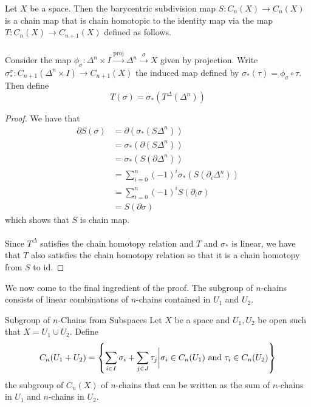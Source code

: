 \documentclass[a4paper]{article}
\begin{document}
\begin{prp}{}{} Let $X$ be a space. Then the barycentric subdivision map $S:C_n(X)\to C_n(X)$ is a chain map that is chain homotopic to the identity map via the map $T:C_n(X)\to C_{n+1}(X)$ defined as follows. \\~\\

Consider the map $\phi_\sigma:\Delta^n\times I\overset{\text{proj}}{\rightarrow}\Delta^n\overset{\sigma}{\rightarrow}X$ given by projection. Write $\sigma_\ast^\sigma:C_{n+1}(\Delta^n\times I)\to C_{n+1}(X)$ the induced map defined by $\sigma_\ast(\tau)=\phi_\sigma\circ\tau$. Then define $$T(\sigma)=\sigma_\ast(T^\Delta(\Delta^n))$$  \tcbline
\begin{proof}
We have that 
\begin{align*}
\partial S(\sigma)&=\partial(\sigma_\ast(S\Delta^n))\\
&=\sigma_\ast(\partial(S\Delta^n))\tag{$\sigma_\ast$ is a chain map}\\
&=\sigma_\ast(S(\partial\Delta^n))\tag{Lemma 4.2.4}\\
&=\sum_{i=0}^n(-1)^i\sigma_\ast(S(\partial_i\Delta^n))\\
&=\sum_{i=0}^n(-1)^iS(\partial_i\sigma)\tag{Definition of $S$}\\
&=S(\partial\sigma)
\end{align*}
which shows that $S$ is chain map. \\~\\

Since $T^\Delta$ satisfies the chain homotopy relation and $T$ and $\sigma_\ast$ is linear, we have that $T$ also satisfies the chain homotopy relation so that it is a chain homotopy from $S$ to $\text{id}$. 
\end{proof}
\end{prp}

We now come to the final ingredient of the proof. The subgroup of $n$-chains consists of linear combinations of $n$-chains contained in $U_1$ and $U_2$. 

\begin{defn}{Subgroup of $n$-Chains from Subspaces}{} Let $X$ be a space and $U_1,U_2$ be open such that $X=U_1\cup U_2$. Define $$C_n(U_1+U_2)=\left\{\sum_{i\in I}\sigma_i+\sum_{j\in J}\tau_j\bigg{|}\sigma_i\in C_n(U_1)\text{ and }\tau_i\in C_n(U_2)\right\}$$ the subgroup of $C_n(X)$ of $n$-chains that can be written as the sum of $n$-chains in $U_1$ and $n$-chains in $U_2$. 
\end{defn}
\end{document}
